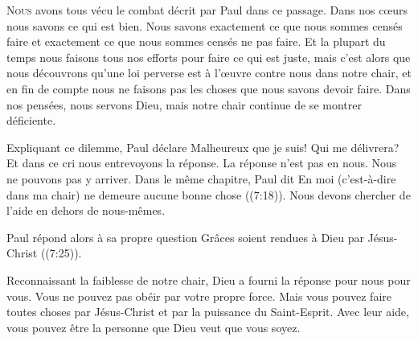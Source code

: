 



\lettrine{N}{ous} avons tous vécu le combat décrit par Paul dans ce passage.
 Dans nos c\oe{}urs nous savons ce qui est bien.
 Nous savons exactement ce que nous sommes censés faire
 et exactement ce que nous sommes censés ne pas faire.
 Et la plupart du temps nous faisons tous nos efforts pour faire
 ce qui est juste, mais c'est alors que nous découvrons qu'une loi perverse
 est à l'\oe{}uvre contre nous dans notre chair,
 et en fin de compte nous ne faisons pas les choses
 que nous savons devoir faire.
 Dans nos pensées, nous servons Dieu,
 mais notre chair continue de se montrer déficiente.

Expliquant ce dilemme, Paul déclare\frcolon{} 
 \Og Malheureux que je suis! Qui me délivrera? \Fg{}
 Et dans ce cri nous entrevoyons la réponse. La réponse n'est pas en nous.
 Nous ne pouvons pas y arriver. Dans le même chapitre, 
 Paul dit\frcolon{} 
 \Og En moi (c'est-à-dire dans ma chair) ne demeure aucune bonne chose \Fg{}
 ((7:18)).
 Nous devons chercher de l'aide en dehors de nous-mêmes.

Paul répond alors à sa propre question\frcolon{} 
 \Og Grâces soient rendues à Dieu par Jésus-Christ \Fg{}
 ((7:25)).

Reconnaissant la faiblesse de notre chair, Dieu a fourni la réponse
 pour nous \ocadr pour vous. Vous ne pouvez pas obéir par votre propre force.
 Mais vous pouvez faire toutes choses par Jésus-Christ et par la puissance
 du Saint-Esprit. Avec leur aide, vous pouvez être la personne que Dieu
 veut que vous soyez.

\dvrule




